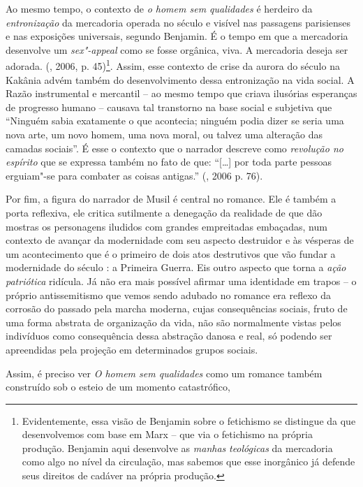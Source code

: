 Ao mesmo tempo, o contexto de \emph{o homem sem qualidades} é herdeiro
da \emph{entronização} da mercadoria operada no século  e visível nas
passagens parisienses e nas exposições universais, segundo Benjamin. É o
tempo em que a mercadoria desenvolve um \emph{sex"-appeal} como se fosse
orgânica, viva. A mercadoria deseja ser adorada. (, 2006, p.
45)\footnote{Evidentemente, essa visão de Benjamin sobre o fetichismo se
  distingue da que desenvolvemos com base em Marx -- que via o
  fetichismo na própria produção. Benjamin aqui desenvolve as
  \emph{manhas} \emph{teológicas} da mercadoria como algo no nível da
  circulação, mas sabemos que esse inorgânico já defende seus direitos
  de cadáver na própria produção.}. Assim, esse contexto de crise da
aurora do século  na Kakânia advém também do desenvolvimento dessa
entronização na vida social. A Razão instrumental e mercantil -- ao
mesmo tempo que criava ilusórias esperanças de progresso humano --
causava tal transtorno na base social e subjetiva que ``Ninguém sabia
exatamente o que acontecia; ninguém podia dizer se seria uma nova arte,
um novo homem, uma nova moral, ou talvez uma alteração das camadas
sociais''. É esse o contexto que o narrador descreve como
\emph{revolução no espírito} que se expressa também no fato de que:
``[\ldots{}] por toda parte pessoas erguiam"-se para combater as coisas
antigas.'' (, 2006 p. 76).

Por fim, a figura do narrador de Musil é central no romance. Ele é
também a porta reflexiva, ele critica sutilmente a denegação da
realidade de que dão mostras os personagens iludidos com grandes
empreitadas embaçadas, num contexto de avançar da modernidade com seu
aspecto destruidor e às vésperas de um acontecimento que é o primeiro de
dois atos destrutivos que vão fundar a modernidade do século : a
Primeira Guerra. Eis outro aspecto que torna a \emph{ação patriótica}
ridícula. Já não era mais possível afirmar uma identidade em trapos -- o
próprio antissemitismo que vemos sendo adubado no romance era reflexo da
corrosão do passado pela marcha moderna, cujas consequências sociais,
fruto de uma forma abstrata de organização da vida, não são normalmente
vistas pelos indivíduos como consequência dessa abstração danosa e real,
só podendo ser apreendidas pela projeção em determinados grupos sociais.

Assim, é preciso ver \emph{O homem sem qualidades} como um romance
também construído sob o esteio de um momento catastrófico,

